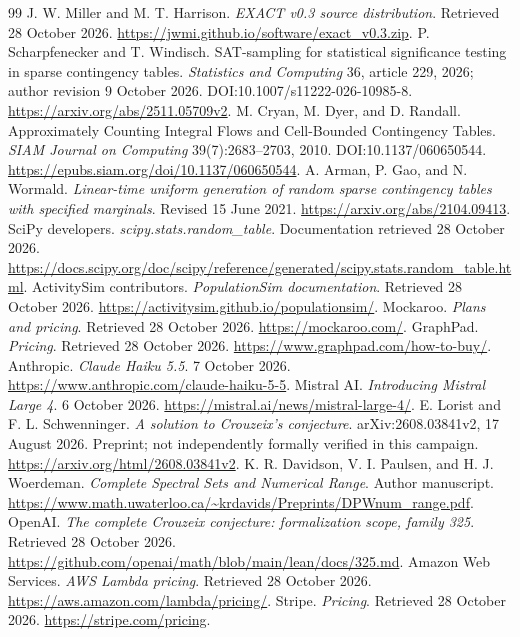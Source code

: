 \documentclass[11pt,letterpaper]{article}
\begin{document}
\begin{thebibliography}{99}
 J. W. Miller and M. T. Harrison. \emph{EXACT v0.3 source distribution}. Retrieved 28 October 2026. \url{https://jwmi.github.io/software/exact_v0.3.zip}.
 P. Scharpfenecker and T. Windisch. SAT-sampling for statistical significance testing in sparse contingency tables. \emph{Statistics and Computing} 36, article 229, 2026; author revision 9 October 2026. DOI:10.1007/s11222-026-10985-8. \url{https://arxiv.org/abs/2511.05709v2}.
 M. Cryan, M. Dyer, and D. Randall. Approximately Counting Integral Flows and Cell-Bounded Contingency Tables. \emph{SIAM Journal on Computing} 39(7):2683--2703, 2010. DOI:10.1137/060650544. \url{https://epubs.siam.org/doi/10.1137/060650544}.
 A. Arman, P. Gao, and N. Wormald. \emph{Linear-time uniform generation of random sparse contingency tables with specified marginals}. Revised 15 June 2021. \url{https://arxiv.org/abs/2104.09413}.
 SciPy developers. \emph{scipy.stats.random\_table}. Documentation retrieved 28 October 2026. \url{https://docs.scipy.org/doc/scipy/reference/generated/scipy.stats.random_table.html}.
 ActivitySim contributors. \emph{PopulationSim documentation}. Retrieved 28 October 2026. \url{https://activitysim.github.io/populationsim/}.
 Mockaroo. \emph{Plans and pricing}. Retrieved 28 October 2026. \url{https://mockaroo.com/}.
 GraphPad. \emph{Pricing}. Retrieved 28 October 2026. \url{https://www.graphpad.com/how-to-buy/}.
 Anthropic. \emph{Claude Haiku 5.5}. 7 October 2026. \url{https://www.anthropic.com/claude-haiku-5-5}.
 Mistral AI. \emph{Introducing Mistral Large 4}. 6 October 2026. \url{https://mistral.ai/news/mistral-large-4/}.
 E. Lorist and F. L. Schwenninger. \emph{A solution to Crouzeix's conjecture}. arXiv:2608.03841v2, 17 August 2026. Preprint; not independently formally verified in this campaign. \url{https://arxiv.org/html/2608.03841v2}.
 K. R. Davidson, V. I. Paulsen, and H. J. Woerdeman. \emph{Complete Spectral Sets and Numerical Range}. Author manuscript. \url{https://www.math.uwaterloo.ca/~krdavids/Preprints/DPWnum_range.pdf}.
 OpenAI. \emph{The complete Crouzeix conjecture: formalization scope, family 325}. Retrieved 28 October 2026. \url{https://github.com/openai/math/blob/main/lean/docs/325.md}.
 Amazon Web Services. \emph{AWS Lambda pricing}. Retrieved 28 October 2026. \url{https://aws.amazon.com/lambda/pricing/}.
 Stripe. \emph{Pricing}. Retrieved 28 October 2026. \url{https://stripe.com/pricing}.
\end{thebibliography}
\end{document}
